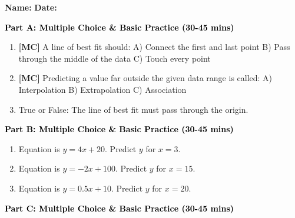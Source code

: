 \documentclass[12pt, letterpaper, fleqn]{article}
\newcommand{\blank}{\underline{\hspace{2.2cm}}}
\begin{document}
\textbf{Name:} \underline{\hspace{5cm}}
\hfill
\textbf{Date:} \underline{\hspace{3cm}}\\


\begin{tcolorbox}[colback=customteal!20]
\large\textcolor{black}{\textbf{Part A: Multiple Choice \& Basic Practice (30-45 mins)}}
\end{tcolorbox}

\vspace{3mm}

\begin{enumerate}[itemsep=2.5cm, leftmargin=0.6cm]
\item \textbf{[MC]} A line of best fit should:
A) Connect the first and last point B) Pass through the middle of the data C) Touch every point
\item \textbf{[MC]} Predicting a value far outside the given data range is called:
A) Interpolation B) Extrapolation C) Association
\item True or False: The line of best fit must pass through the origin. \blank
\end{enumerate}

\newpage

\begin{tcolorbox}[colback=customteal!20]
\large\textcolor{black}{\textbf{Part B: Multiple Choice \& Basic Practice (30-45 mins)}}
\end{tcolorbox}

\vspace{3mm}

\begin{enumerate}[itemsep=2.5cm, leftmargin=0.6cm, resume]
\item Equation is $y = 4x + 20$. Predict $y$ for $x = 3$. \blank
\item Equation is $y = -2x + 100$. Predict $y$ for $x = 15$. \blank
\item Equation is $y = 0.5x + 10$. Predict $y$ for $x = 20$. \blank
\end{enumerate}

\newpage

\begin{tcolorbox}[colback=customteal!20]
\large\textcolor{black}{\textbf{Part C: Multiple Choice \& Basic Practice (30-45 mins)}}
\end{tcolorbox}

\vspace{3mm}
\end{document}
